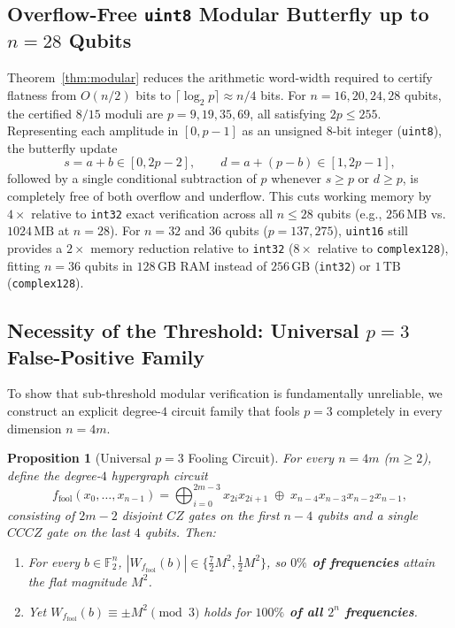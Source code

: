 \documentclass[11pt,a4paper]{article}
\newtheorem{proposition}{Proposition}
\newcommand{\F}{\mathbb{F}}
\begin{document}
\subsection{Overflow-Free \texttt{uint8} Modular Butterfly up to $n = 28$ Qubits}
Theorem~\ref{thm:modular} reduces the arithmetic word-width required to certify flatness from $O(n/2)$ bits to $\lceil \log_2 p \rceil \approx n/4$ bits. For $n = 16, 20, 24, 28$ qubits, the certified $8/15$ moduli are $p = 9, 19, 35, 69$, all satisfying $2p \le 255$. Representing each amplitude in $[0, p-1]$ as an unsigned 8-bit integer (\texttt{uint8}), the butterfly update
\[
  s = a + b \in [0, 2p-2], \qquad
  d = a + (p - b) \in [1, 2p-1],
\]
followed by a single conditional subtraction of $p$ whenever $s \ge p$ or $d \ge p$, is completely free of both overflow and underflow. This cuts working memory by $4\times$ relative to \texttt{int32} exact verification across all $n \le 28$ qubits (e.g., $256\,\text{MB}$ vs.\ $1024\,\text{MB}$ at $n = 28$). For $n = 32$ and $36$ qubits ($p = 137, 275$), \texttt{uint16} still provides a $2\times$ memory reduction relative to \texttt{int32} ($8\times$ relative to \texttt{complex128}), fitting $n = 36$ qubits in $128\,\text{GB}$ RAM instead of $256\,\text{GB}$ (\texttt{int32}) or $1\,\text{TB}$ (\texttt{complex128}).

\subsection{Necessity of the Threshold: Universal $p=3$ False-Positive Family}
To show that sub-threshold modular verification is fundamentally unreliable, we construct an explicit degree-$4$ circuit family that fools $p=3$ completely in every dimension $n=4m$.

\begin{proposition}[Universal $p=3$ Fooling Circuit]
\label{prop:fool}
For every $n = 4m$ ($m \ge 2$), define the degree-$4$ hypergraph circuit
\[
  f_{\mathrm{fool}}(x_0,\dots,x_{n-1})
  = \bigoplus_{i=0}^{2m-3} x_{2i} x_{2i+1}
  \;\oplus\; x_{n-4}x_{n-3}x_{n-2}x_{n-1},
\]
consisting of $2m-2$ disjoint $CZ$ gates on the first $n-4$ qubits and a single $CCCZ$ gate on the last $4$ qubits. Then:
\begin{enumerate}
  \item For every $b \in \F_2^n$, $|W_{f_{\mathrm{fool}}}(b)| \in \{\frac{7}{2}M^2, \frac{1}{2}M^2\}$, so \textbf{$0\%$ of frequencies} attain the flat magnitude $M^2$.
  \item Yet $W_{f_{\mathrm{fool}}}(b) \equiv \pm M^2 \pmod 3$ holds for \textbf{$100\%$ of all $2^n$ frequencies}.
\end{enumerate}
\end{proposition}
\end{document}
